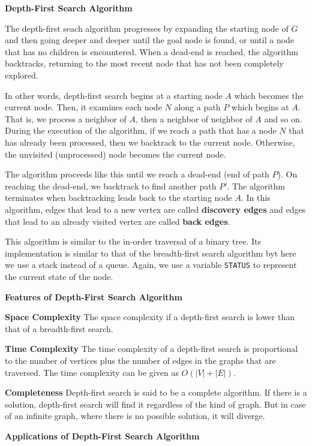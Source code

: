\filbreak
\vskip 1cm
{\bf Depth-First Search Algorithm}

\vskip 1mm
The depth-first seach algorithm progresses by expanding the starting node of $G$ and then going deeper and deeper until the goal node is found, or until a node that has no children is encountered. When a dead-end is reached, the algorithm backtracks, returning to the most recent node that has not been completely explored.

\vskip 1mm
In other words, depth-first search begins at a starting node $A$ which becomes the current node. Then, it examines each node $N$ along a path $P$ which begins at $A$. That is, we process a neighbor of $A$, then a neighbor of neighbor of $A$ and so on. During the execution of the algorithm, if we reach a path that has a node $N$ that has already been processed, then we backtrack to the current node. Otherwise, the unvisited (unprocessed) node becomes the current node.

\vskip 1mm
The algorithm proceeds like this until we reach a dead-end (end of path $P$). On reaching the dead-end, we backtrack to find another path $P'$. The algorithm terminates when backtracking leads back to the starting node $A$. In this algorithm, edges that lead to a new vertex are called {\bf discovery edges} and edges that lead to an already visited vertex are called {\bf back edges}.

\vskip 1mm
This algorithm is similar to the in-order traversal of a binary tree. Its implementation is similar to that of the breadth-first search algorithm byt here we use a stack instead of a queue. Again, we use a variable {\tt STATUS} to represent the current state of the node.

\vskip 3mm
{\bf Features of Depth-First Search Algorithm}

\vskip 1mm
{\bf Space Complexity} The space complexity if a depth-first search is lower than that of a breadth-first search.

\vskip 3mm
{\bf Time Complexity} The time complexity of a depth-first search is proportional to the number of vertices plus the number of edges in the graphs that are traversed. The time complexity can be given as $O(|V|+|E|)$.

\vskip 3mm
{\bf Completeness} Depth-first search is said to be a complete algorithm. If there is a solution, depth-first search will find it regardless of the kind of graph. But in case of an infinite graph, where there is no possible solution, it will diverge.

\vskip 3mm
{\bf Applications of Depth-First Search Algorithm}

